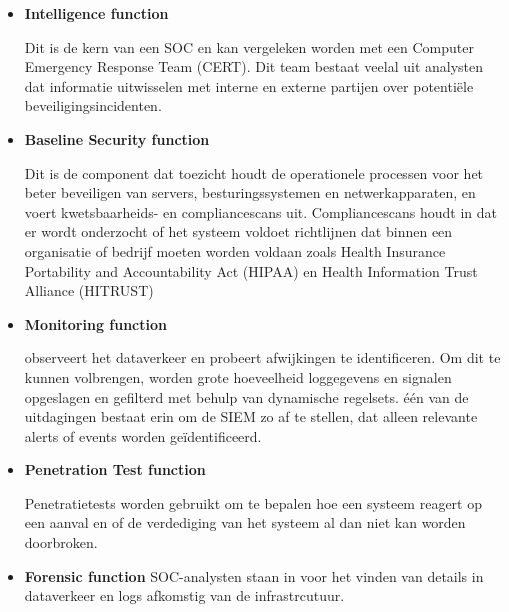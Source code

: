 \begin{itemize}
    \item \textbf{Intelligence function}
    
    Dit is de kern van een SOC en kan vergeleken worden met een Computer Emergency Response Team (CERT). Dit team bestaat veelal uit analysten dat informatie uitwisselen met interne en externe partijen over potentiële beveiligingsincidenten.
    
    \item \textbf{Baseline Security function}
    
    Dit is de component dat toezicht houdt de operationele processen voor het beter beveiligen van servers, besturingssystemen en netwerkapparaten, en voert kwetsbaarheids- en compliancescans uit. Compliancescans houdt in dat er wordt onderzocht of het systeem voldoet richtlijnen dat binnen een organisatie of bedrijf moeten worden voldaan zoals Health Insurance Portability and Accountability Act (HIPAA) en Health Information Trust Alliance (HITRUST)
    
    \item \textbf{Monitoring function}
    
    observeert het dataverkeer en probeert afwijkingen te identificeren. Om dit te kunnen volbrengen, worden grote hoeveelheid loggegevens en signalen opgeslagen en gefilterd met behulp van dynamische regelsets. één van de uitdagingen bestaat erin om de SIEM zo af te stellen, dat alleen relevante alerts of events worden geïdentificeerd.
    
    \item \textbf{Penetration Test function  }  
    
    Penetratietests worden gebruikt om te bepalen hoe een systeem reagert op een aanval en of de verdediging van het systeem al dan niet kan worden doorbroken.
    
    \item \textbf{Forensic function}
    SOC-analysten staan in voor het vinden van details in dataverkeer en logs afkomstig van de infrastrcutuur.
    
    
    
\end{itemize}














\subsection{}

